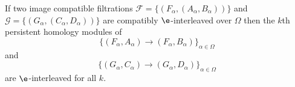 \begin{theorem}

  If two image compatible filtrations $\mathcal{F} = \{(F_\alpha, (A_\alpha, B_\alpha))\}$ and $\mathcal{G} = \{(G_\alpha, (C_\alpha, D_\alpha))\}$ are compatibly $\e$-interleaved over $\Omega$ then the $k$th persistent homology modules of
  \[ \{(F_\alpha, A_\alpha)\to (F_\alpha, B_\alpha)\}_{\alpha\in\Omega}\]
  and
  \[\{(G_\alpha, C_\alpha)\to (G_\alpha, D_\alpha)\}_{\alpha\in\Omega}\]
  are $\e$-interleaved for all $k$.
\end{theorem}
